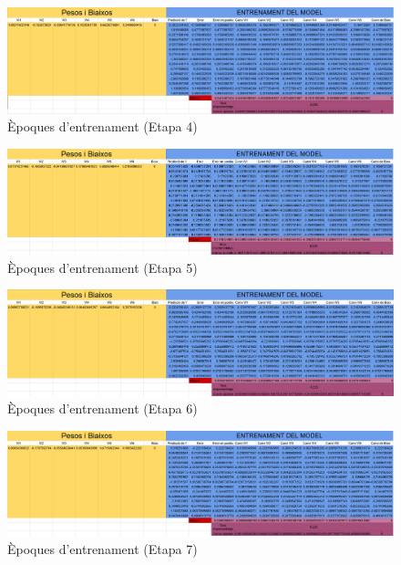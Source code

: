 \begin{figure}[H]
    \centering
    \includegraphics[width=1\textwidth]{./figures/Etapa4.png}
    \caption{Èpoques d'entrenament (Etapa 4)}
\end{figure}

\begin{figure}[H]
    \centering
    \includegraphics[width=1\textwidth]{./figures/Etapa5.png}
    \caption{Èpoques d'entrenament (Etapa 5)}
\end{figure}

\begin{figure}[H]
    \centering
    \includegraphics[width=1\textwidth]{./figures/Etapa6.png}
    \caption{Èpoques d'entrenament (Etapa 6)}
\end{figure}

\begin{figure}[H]
    \centering
    \includegraphics[width=1\textwidth]{./figures/Etapa7.png}
    \caption{Èpoques d'entrenament (Etapa 7)}
\end{figure}

